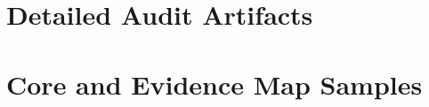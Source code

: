 \documentclass[11pt]{article}
\begin{document}
\section{Detailed Audit Artifacts}
\label{sec:audit-artifacts}












\section{Core and Evidence Map Samples}

\label{sec:lit-map}

\end{document}
